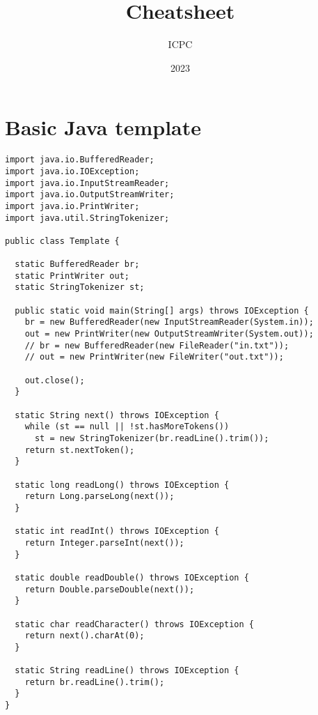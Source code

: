 \documentclass{article}
\title{Cheatsheet}
\date{2023}
\author{ICPC}
\begin{document}
\maketitle
\section{Basic Java template}
\begin{lstlisting}[basicstyle=\large\ttfamily,linewidth=\columnwidth,breaklines=true,language==Java]
import java.io.BufferedReader;
import java.io.IOException;
import java.io.InputStreamReader;
import java.io.OutputStreamWriter;
import java.io.PrintWriter;
import java.util.StringTokenizer;

public class Template {

  static BufferedReader br;
  static PrintWriter out;
  static StringTokenizer st;

  public static void main(String[] args) throws IOException {
    br = new BufferedReader(new InputStreamReader(System.in));
    out = new PrintWriter(new OutputStreamWriter(System.out));
    // br = new BufferedReader(new FileReader("in.txt"));
    // out = new PrintWriter(new FileWriter("out.txt"));

    out.close();
  }

  static String next() throws IOException {
    while (st == null || !st.hasMoreTokens())
      st = new StringTokenizer(br.readLine().trim());
    return st.nextToken();
  }

  static long readLong() throws IOException {
    return Long.parseLong(next());
  }

  static int readInt() throws IOException {
    return Integer.parseInt(next());
  }

  static double readDouble() throws IOException {
    return Double.parseDouble(next());
  }

  static char readCharacter() throws IOException {
    return next().charAt(0);
  }

  static String readLine() throws IOException {
    return br.readLine().trim();
  }
}

\end{lstlisting}
\end{document}
